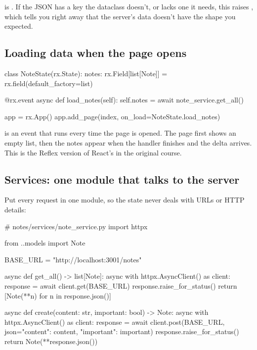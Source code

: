 \begin{py}
\end{py}

 is . If the JSON has a key the dataclass doesn't, or lacks one it needs, this raises , which tells you right away that the server's data doesn't have the shape you expected.

\subsection{Loading data when the page opens}

\begin{py}
class NoteState(rx.State):
	notes: rx.Field[list[Note]] = rx.field(default_factory=list)

	@rx.event
	async def load_notes(self):
		self.notes = await note_service.get_all()


app = rx.App()
app.add_page(index, on_load=NoteState.load_notes)
\end{py}

 is an event that runs every time the page is opened. The page first shows an empty list, then the notes appear when the handler finishes and the delta arrives. This is the Reflex version of React's  in the original course.

\subsection{Services: one module that talks to the server}

Put every request in one module, so the state never deals with URLs or HTTP details:

\begin{py}
# notes/services/note_service.py
import httpx

from ..models import Note

BASE_URL = "http://localhost:3001/notes"


async def get_all() -> list[Note]:
	async with httpx.AsyncClient() as client:
		response = await client.get(BASE_URL)
	response.raise_for_status()
	return [Note(**n) for n in response.json()]


async def create(content: str, important: bool) -> Note:
	async with httpx.AsyncClient() as client:
		response = await client.post(BASE_URL, json={"content": content, "important": important})
	response.raise_for_status()
	return Note(**response.json())
\end{py}

